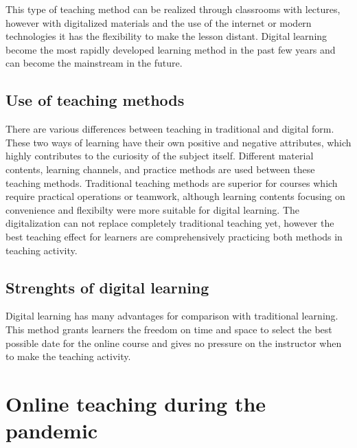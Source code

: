 \documentclass[10pt,oneside,english,a4paper]{article}
\begin{document}
	This type of teaching method can be realized through classrooms with lectures, however with digitalized materials and the use of the internet or modern technologies it has the flexibility to make the lesson distant. Digital learning become the most rapidly developed learning method in the past few years and can become the mainstream in the future.\cite{Lin2017}

\subsection{Use of teaching methods}\label{3.3}

	There are various differences between teaching in traditional and digital form. These two ways of learning have their own positive and negative attributes, which highly contributes to the curiosity of the subject itself. Different material contents, learning channels, and practice methods are used between these teaching methods. Traditional teaching methods are superior for courses which require practical operations or teamwork, although learning contents focusing on convenience and flexibilty were more suitable for digital  learning. The digitalization can not replace completely traditional teaching yet, however the best teaching effect for learners are comprehensively practicing both methods in teaching activity.\cite{Lin2017}

\subsection{Strenghts of digital learning}\label{3.4}

	Digital learning has many advantages for comparison with traditional learning. This method grants learners the freedom on time and space to select the best possible date for the online course and gives no pressure on the instructor when to make the teaching activity.  \cite{Lin2017}


\section{Online teaching during the pandemic}\label{covid}
\end{document}
